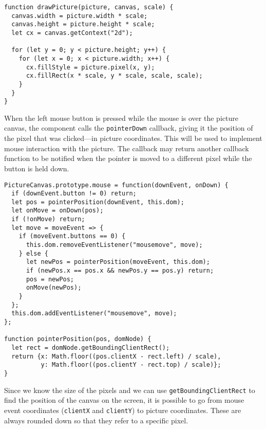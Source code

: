 \begin{lstlisting}
function drawPicture(picture, canvas, scale) {
  canvas.width = picture.width * scale;
  canvas.height = picture.height * scale;
  let cx = canvas.getContext("2d");

  for (let y = 0; y < picture.height; y++) {
    for (let x = 0; x < picture.width; x++) {
      cx.fillStyle = picture.pixel(x, y);
      cx.fillRect(x * scale, y * scale, scale, scale);
    }
  }
}
\end{lstlisting}
\noindent{}

When the left mouse button is pressed while the mouse is over the picture canvas, the component calls the \lstinline`pointerDown` callback, giving it the position of the pixel that was clicked—in picture coordinates. This will be used to implement mouse interaction with the picture. The callback may return another callback function to be notified when the pointer is moved to a different pixel while the button is held down.

\begin{lstlisting}
PictureCanvas.prototype.mouse = function(downEvent, onDown) {
  if (downEvent.button != 0) return;
  let pos = pointerPosition(downEvent, this.dom);
  let onMove = onDown(pos);
  if (!onMove) return;
  let move = moveEvent => {
    if (moveEvent.buttons == 0) {
      this.dom.removeEventListener("mousemove", move);
    } else {
      let newPos = pointerPosition(moveEvent, this.dom);
      if (newPos.x == pos.x && newPos.y == pos.y) return;
      pos = newPos;
      onMove(newPos);
    }
  };
  this.dom.addEventListener("mousemove", move);
};

function pointerPosition(pos, domNode) {
  let rect = domNode.getBoundingClientRect();
  return {x: Math.floor((pos.clientX - rect.left) / scale),
          y: Math.floor((pos.clientY - rect.top) / scale)};
}
\end{lstlisting}
\noindent{}

Since we know the size of the pixels and we can use \lstinline`getBoundingClientRect` to find the position of the canvas on the screen, it is possible to go from mouse event coordinates (\lstinline`clientX` and \lstinline`clientY`) to picture coordinates. These are always rounded down so that they refer to a specific pixel.

